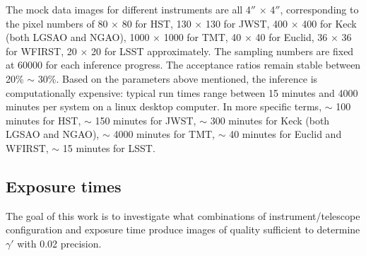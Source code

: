 \documentclass[a4paper,11pt]{article}
\begin{document}
%

The mock data images for different instruments are all 4$''$ $\times$
4$''$, corresponding to the pixel numbers of 80 $\times$ 80 for HST,
130 $\times$ 130 for JWST, 400 $\times$ 400 for Keck (both LGSAO and
NGAO), 1000 $\times$ 1000 for TMT, 40 $\times$ 40 for Euclid, 36
$\times$ 36 for WFIRST, 20 $\times$ 20 for LSST approximately. The sampling
numbers are fixed at 60000 for each inference progress.
The acceptance ratios remain stable between 20\% $\sim$ 30\%.
Based on the parameters above mentioned, the inference is computationally expensive: typical run times range
between 15 minutes and 4000 minutes per system on a
linux desktop computer. In more specific terms, $\sim$ 100 minutes for HST,
$\sim$ 150 minutes for JWST, $\sim$ 300 minutes for Keck (both LGSAO and NGAO),
$\sim$ 4000 minutes for TMT, $\sim$ 40 minutes for Euclid and WFIRST, $\sim$ 15 minutes for LSST.

\subsection{Exposure times}

The goal of this work is to investigate what combinations of
instrument/telescope configuration and exposure time produce images of
quality sufficient to determine $\gamma'$ with 0.02 precision.
\end{document}
